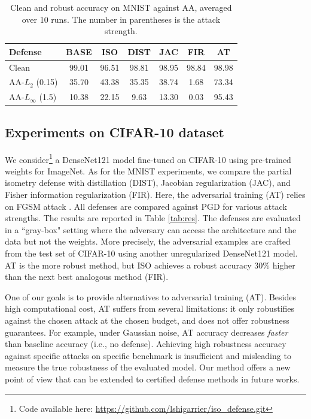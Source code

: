 \documentclass[entropy,article,submit,pdftex,moreauthors]{Definitions/mdpi}
\theoremstyle{plain}
\theoremstyle{definition}
\begin{document}
\begin{table}
\begin{center}\scriptsize
    \begin{tabular}{|l||c|c|c|c|c|c|}\hline
        \bf Defense & \bf BASE & \bf ISO & \bf DIST & \bf JAC & \bf FIR & \bf AT \\
        \hline
        \hline
        Clean & 99.01 & 96.51 & 98.81 & 98.95 & 98.84 & 98.98 \\
        \hline
        AA-$L_2$ (0.15) & 35.70 & 43.38 & 35.35 & 38.74 & 1.68 & 73.34 \\
        \hline
        AA-$L_\infty$ (1.5) & 10.38 & 22.15 & 9.63 & 13.30 & 0.03 & 95.43 \\
        \hline
    \end{tabular}
    \caption{Clean and robust accuracy on MNIST against AA, averaged over 10 runs. The number in parentheses is the attack strength.}
    \label{tab:robust}
\end{center}
\end{table}

\subsection{Experiments on CIFAR-10 dataset}

We consider\footnote{Code available here: \url{https://github.com/lshigarrier/iso_defense.git}} a DenseNet121 model fine-tuned on CIFAR-10 using pre-trained weights for ImageNet. As for the MNIST experiments, we compare the partial isometry defense with distillation (DIST), Jacobian regularization (JAC), and Fisher information regularization (FIR). Here, the adversarial training (AT) relies on FGSM attack \citep{wong2020}. All defenses are compared against PGD for various attack strengths. The results are reported in Table \ref{tab:res}. The defenses are evaluated in a ``gray-box" setting where the adversary can access the architecture and the data but not the weights. More precisely, the adversarial examples are crafted from the test set of CIFAR-10 using another unregularized DenseNet121 model. AT is the more robust method, but ISO achieves a robust accuracy 30\% higher than the next best analogous method (FIR).

One of our goals is to provide alternatives to adversarial training (AT). Besides high computational cost, AT suffers from several limitations: it only robustifies against the chosen attack at the chosen budget, and does not offer robustness guarantees. For example, under Gaussian noise, AT accuracy decreases \emph{faster} than baseline accuracy (i.e., no defense). Achieving high robustness accuracy against specific attacks on specific benchmark is insufficient and misleading to measure the true robustness of the evaluated model. Our method offers a new point of view that can be extended to certified defense methods in future works.
\end{document}

